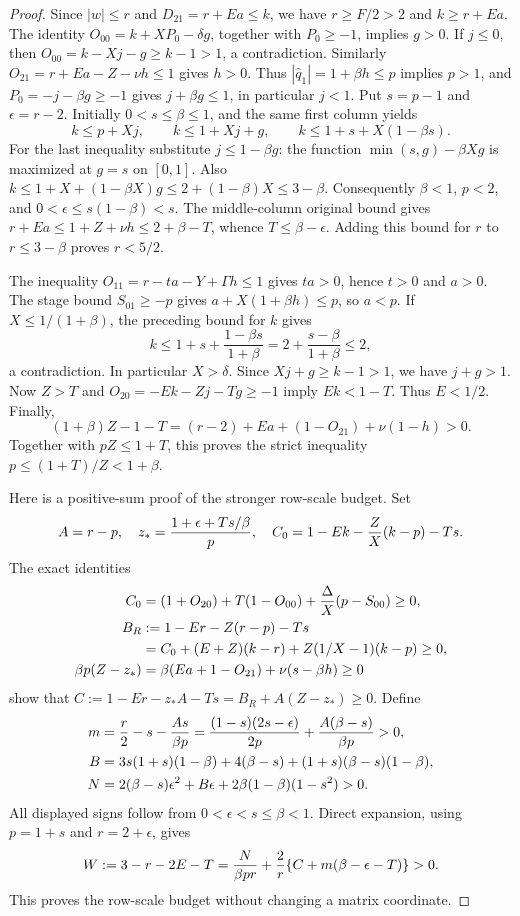 \documentclass[11pt,reqno]{amsart}
\theoremstyle{definition}
\theoremstyle{remark}
\begin{document}
\begin{proof}
Since \(|w|\le r\) and \(D_{21}=r+Ea\le k\), we have
\(r\ge F/2>2\) and \(k\ge r+Ea\).
The identity \(O_{00}=k+XP_0-\delta g\), together with
\(P_0\ge-1\), implies \(g>0\). If \(j\le0\), then
\(O_{00}=k-Xj-g\ge k-1>1\), a contradiction. Similarly
\(O_{21}=r+Ea-Z-\nu h\le1\) gives \(h>0\).
Thus \(|\widehat q_1|=1+\beta h\le p\) implies \(p>1\),
and \(P_0=-j-\beta g\ge-1\) gives
\(j+\beta g\le1\), in particular \(j<1\).
Put \(s=p-1\) and \(\epsilon=r-2\). Initially
\(0<s\le\beta\le1\), and the same first column yields
\[
 k\le p+Xj,\qquad k\le1+Xj+g,
 \qquad k\le1+s+X(1-\beta s).
\]
For the last inequality substitute \(j\le1-\beta g\):
the function \(\min(s,g)-\beta Xg\) is maximized at \(g=s\)
on \([0,1]\). Also
\(k\le1+X+(1-\beta X)g\le2+(1-\beta)X\le3-\beta\).
Consequently \(\beta<1\), \(p<2\), and
\(0<\epsilon\le s(1-\beta)<s\).
The middle-column original bound gives
\(r+Ea\le1+Z+\nu h\le2+\beta-T\), whence
\(T\le\beta-\epsilon\). Adding this bound for \(r\) to
\(r\le3-\beta\) proves \(r<5/2\).

The inequality \(O_{11}=r-ta-Y+\Gamma h\le1\) gives
\(ta>0\), hence \(t>0\) and \(a>0\).
The stage bound \(S_{01}\ge-p\) gives
\(a+X(1+\beta h)\le p\), so \(a<p\).
If \(X\le1/(1+\beta)\), the preceding bound for \(k\) gives
\[
 k\le1+s+\frac{1-\beta s}{1+\beta}
 =2+\frac{s-\beta}{1+\beta}\le2,
\]
a contradiction. In particular \(X>\delta\).
Since \(Xj+g\ge k-1>1\), we have \(j+g>1\).
Now \(Z>T\) and \(O_{20}=-Ek-Zj-Tg\ge-1\) imply
\(Ek<1-T\). Thus \(E<1/2\).
Finally,
\[
 (1+\beta)Z-1-T
 =(r-2)+Ea+(1-O_{21})+\nu(1-h)>0.
\]
Together with \(pZ\le1+T\), this proves the strict inequality
\(p\le(1+T)/Z<1+\beta\).

Here is a positive-sum proof of the stronger row-scale budget.
Set
\[
 A=r-p,\quad z_*={1+\epsilon+Ts/\beta\over p},\quad
 C_0=1-Ek-{Z\over X}(k-p)-Ts.
\]
The exact identities
\begin{align*}
 C_0&=(1+O_{20})+T(1-O_{00})
       +{\Delta\over X}(p-S_{00})\ge0,\\
 B_R&:=1-Er-Z(r-p)-Ts\\
    &=C_0+(E+Z)(k-r)+Z(1/X-1)(k-p)\ge0,\\
 \beta p(Z-z_*)&=\beta(Ea+1-O_{21})
                      +\nu(s-\beta h)\ge0
\end{align*}
show that \(C:=1-Er-z_*A-Ts=B_R+A(Z-z_*)\ge0\).
Define
\begin{align*}
 m&={r\over2}-s-{As\over\beta p}
   ={(1-s)(2s-\epsilon)\over2p}
     +{A(\beta-s)\over\beta p}>0,\\
 B&=3s(1+s)(1-\beta)+4(\beta-s)
                   +(1+s)(\beta-s)(1-\beta),\\
 N&=2(\beta-s)\epsilon^2+B\epsilon
                        +2\beta(1-\beta)(1-s^2)>0.
\end{align*}
All displayed signs follow from \(0<\epsilon<s\le\beta<1\).
Direct expansion, using \(p=1+s\) and \(r=2+\epsilon\), gives
\[
 W:=3-r-2E-T
 ={N\over\beta p r}
  +{2\over r}\{C+m(\beta-\epsilon-T)\}>0.
\]
This proves the row-scale budget without changing a matrix coordinate.


\end{proof}
\end{document}

